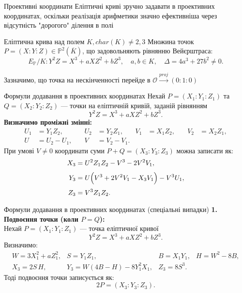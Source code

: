 \documentclass[9pt]{beamer}
\begin{document}
\begin{darkframes}
\begin{frame}{Проективні координати}
Еліптичні криві зручно задавати в проективних координатах, оскільки реалізація арифметики значно ефективніша через відсутність "дорогого" ділення в полі

  \begin{block}{Еліптична крива над полем $K, char(K) \neq 2,3$}
  Множина точок $P = (X:Y:Z) \in \mathbb{P}^2(\overline{K})$, що задовольняють рівнянню Вейєрштраса:
  \[
  E_{\mathbb{P}}/K: Y^2Z = X^3 + aXZ^2 + bZ^3,\quad a,b\in K,\quad \Delta = 4a^3+27b^2\neq 0.
  \]

\end{block}
  Зазначимо, що точка на нескінченності перейде в $\mathcal{O} \xrightarrow{proj} (0:1:0)$
\end{frame}

\begin{frame}{Формули додавання в проективних координатах}
  Нехай \(P=(X_1:Y_1:Z_1)\) та \(Q=(X_2:Y_2:Z_2)\) --- точки на еліптичній кривій, заданій рівнянням
  \[
  Y^2Z = X^3 + aXZ^2 + bZ^3.
  \]
  \textbf{Визначимо проміжні змінні:}
  \[
  \begin{aligned}
  U_1 &= Y_1 Z_2,\quad &U_2 &= Y_2 Z_1,&
  V_1 &= X_1 Z_2,\quad &V_2 &= X_2 Z_1,\\
  U &= U_2 - U_1,\quad &V &= V_2 - V_1.
  \end{aligned}
  \]
  При умові \(V\neq 0\) координати суми \(P+Q=(X_3:Y_3:Z_3)\) можна записати як:
  \[
  \begin{aligned}
  X_3 &= U^2Z_1Z_2 - V^3 - 2V^2V_1,\\[1mm]
  Y_3 &= U\Bigl(V^3 + 2V^2V_1 - X_3V_1\Bigr) - V^3U_1,\\[1mm]
  Z_3 &= V^3Z_1Z_2.
  \end{aligned}
  \]
\end{frame}

\begin{frame}{Формули додавання в проективних координатах (спеціальні випадки)}
  \textbf{1. Подвоєння точки (коли \(P=Q\)):} \\
  Нехай \(P=(X_1:Y_1:Z_1)\) — точка еліптичної кривої
  \[
  Y^2Z = X^3 + aXZ^2 + bZ^3.
  \]
  Визначимо:
  \[
  \begin{array}{aligned}
  W = 3X_1^2 + aZ_1^2,&
  S = Y_1Z_1,&
  B = X_1Y_1,&
  H = W^2 - 8B,\\
  X_3 = 2S\,H,&
  Y_3 = W(4B - H) - 8Y_1^2X_1,&
  Z_3 = 8S^3.
  \end{array}
  \]
  Тоді подвоєння точки записується як:
  \[
  2P = (X_3:Y_3:Z_3).
  \]
  

\end{frame}
\end{darkframes}
\end{document}
